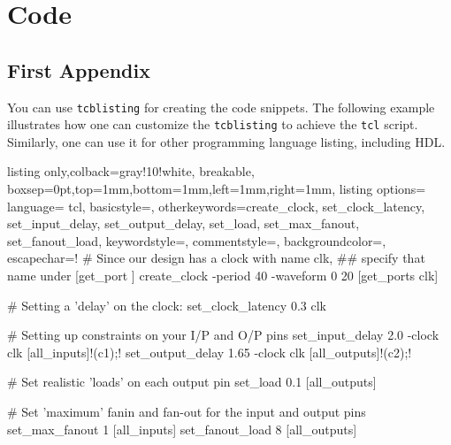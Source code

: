 \chapter{Code}
\section{First Appendix}
You can use \texttt{tcblisting} for creating the code snippets. The following example illustrates how one can customize the \texttt{tcblisting} to achieve the \texttt{tcl} script. Similarly, one can use it for other programming language listing, including HDL.

\begin{tcblisting}{listing only,colback=gray!10!white, breakable, boxsep=0pt,top=1mm,bottom=1mm,left=1mm,right=1mm,
listing options={
language= tcl,
basicstyle=\small\ttfamily, 
otherkeywords={create_clock, set_clock_latency, set_input_delay, set_output_delay, set_load, set_max_fanout, set_fanout_load},
keywordstyle=\color{blue}, 
commentstyle=\color{gray},
backgroundcolor=\color{gray!25},
escapechar=!}}
# Since our design has a clock with name clk, 
## specify that name under [get_port ]
create_clock -period 40 -waveform {0 20} [get_ports clk]

# Setting a 'delay' on the clock:
set_clock_latency 0.3 clk

# Setting up constraints on your I/P and O/P pins
set_input_delay 2.0 -clock clk [all_inputs]!\node[](c1){};!
set_output_delay 1.65 -clock clk [all_outputs]!\node[](c2){};!

# Set realistic 'loads' on each output pin
set_load 0.1 [all_outputs]

# Set 'maximum' fanin and fan-out for the input and output pins 
set_max_fanout 1 [all_inputs]
set_fanout_load 8 [all_outputs]      
\end{tcblisting}